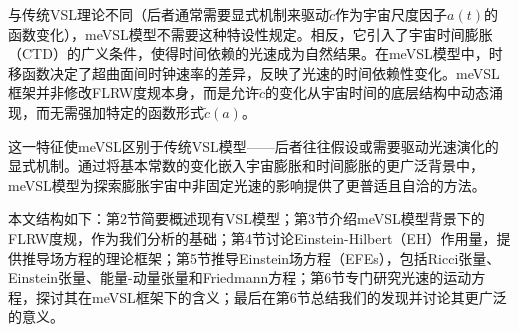\documentclass[jkps,preprint,fleqn]{revtex4}
\newcommand{\tc}{\tilde{c}}
\begin{document}
\begin{CJK*}{UTF8}{gbsn}
与传统VSL理论不同（后者通常需要显式机制来驱动$\tc$作为宇宙尺度因子$a(t)$的函数变化），meVSL模型不需要这种特设性规定。相反，它引入了宇宙时间膨胀（CTD）的广义条件，使得时间依赖的光速成为自然结果。在meVSL模型中，时移函数决定了超曲面间时钟速率的差异，反映了光速的时间依赖性变化\cite{Lee:2024zcu}。meVSL框架并非修改FLRW度规本身，而是允许$\tc$的变化从宇宙时间的底层结构中动态涌现，而无需强加特定的函数形式$\tc(a)$。

这一特征使meVSL区别于传统VSL模型——后者往往假设或需要驱动光速演化的显式机制\cite{Avelino:1999is,Belinchon:1999kq,Avelino:2000ph,Szydlowski:2002kz,Magueijo:2003gj,Shojaie:2004sq,Shojaie:2004xw,Balcerzak:2013kha,Balcerzak:2014rga,Franzmann:2017nsc,Hanimeli:2019wrt,Skara:2019usd,Bhattacharjee:2020fgl,Gupta:2020anq,Cuzinatto:2022mfe,Cuzinatto:2022vvy,Cuzinatto:2022dta,Bileska:2024odt,Coleman:1997xq,Albrecht:1998ir,Barrow:1998df,Barrow:1999is,Bassett:2000wj,Jacobson:2000xp,Magueijo:2000zt,Clayton:1998hv,Drummond:1999ut,Clayton:1999zs,Liberati:2000us,Clayton:2000xt,Drummond:2001rj,Amelino-Camelia:1996bln,Amelino-Camelia:1997ieq,Ellis:1999sd,Amelino-Camelia:2000bxx,Amelino-Camelia:2000cpa,Ellis:2000sf,Kowalski-Glikman:2001vvk,Bruno:2001mw,Magueijo:2001cr,Amelino-Camelia:2002uql,Magueijo:2002pg,Moffat:1992ud,Manida:1999rx,Barrow:1999st,Stepanov:1999ax,Magueijo:2000au,Moffat:2002nm,Kaelbermann:1998hu,Randall:1999ee,Randall:1999vf,Kiritsis:1999tx,Chung:1999xg,Alexander:1999cb,Ishihara:2000nf,Csaki:2000dm,Youm:2001sw,Youm:2001zk,Grojean:2001pv,Youm:2001zp,Drummond:1979pp,Novello:1988ma,Barton:1989dq,Scharnhorst:1990sr,Shore:1995fz,Colladay:1995qb,Coleman:1998ti,Bertolami:1999da,Shore:2000bs,Greenberg:2002uu,Teyssandier:2003qh,Shore:2003zc,Blasone:2003wf,Alexander:2001dr,Burgess:2002tb}。通过将基本常数的变化嵌入宇宙膨胀和时间膨胀的更广泛背景中，meVSL模型为探索膨胀宇宙中非固定光速的影响提供了更普适且自洽的方法。

本文结构如下：第2节简要概述现有VSL模型；第3节介绍meVSL模型背景下的FLRW度规，作为我们分析的基础；第4节讨论Einstein-Hilbert（EH）作用量，提供推导场方程的理论框架；第5节推导Einstein场方程（EFEs），包括Ricci张量、Einstein张量、能量-动量张量和Friedmann方程；第6节专门研究光速的运动方程，探讨其在meVSL框架下的含义；最后在第6节总结我们的发现并讨论其更广泛的意义。

\end{CJK*}
\end{document}
